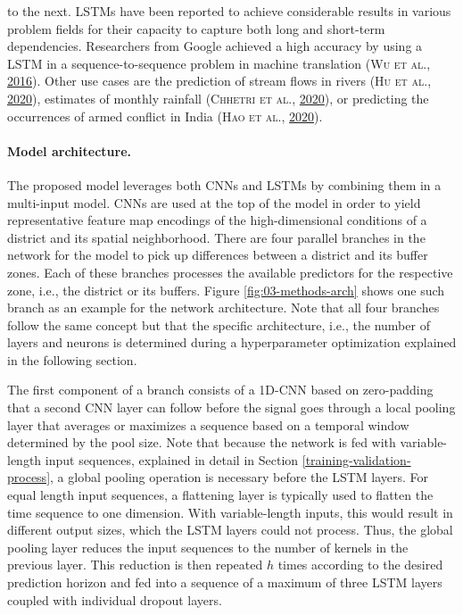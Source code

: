 \documentclass[a4paper,11pt]{article}
\begin{document}
to the next.
LSTMs have
been reported to achieve considerable results in various problem fields for their
capacity to capture both long and short-term dependencies. Researchers
from Google achieved a high accuracy by using a LSTM in a sequence-to-sequence problem
in machine translation \textsc{(\textnormal{\textsc{Wu} \textsc{et al.}}, \textnormal{\protect\hyperlink{ref-wu2016}{2016}})}. Other use cases are the prediction of stream flows
in rivers \textsc{(\textnormal{\textsc{Hu} \textsc{et al.}}, \textnormal{\protect\hyperlink{ref-hu2020}{2020}})}, estimates of monthly rainfall \textsc{(\textnormal{\textsc{Chhetri} \textsc{et al.}}, \textnormal{\protect\hyperlink{ref-chhetri2020}{2020}})}, or predicting
the occurrences of armed conflict in India \textsc{(\textnormal{\textsc{Hao} \textsc{et al.}}, \textnormal{\protect\hyperlink{ref-hao2020a}{2020}})}.

\newpage

\hypertarget{model-architecture.}{%
\paragraph{Model architecture.}\label{model-architecture.}}

The proposed model leverages both CNNs and LSTMs by combining them
in a multi-input model. CNNs are used at the top of the model in
order to yield representative feature map encodings of the high-dimensional
conditions of a district and its spatial neighborhood. There are four parallel
branches in the network for the model to pick up differences between a district
and its buffer zones. Each of these branches processes the available predictors for the
respective zone, i.e., the district or its buffers. Figure \ref{fig:03-methods-arch}
shows one such branch as an example for the network architecture. Note that all four
branches follow the same concept but that the specific architecture, i.e., the
number of layers and neurons is determined during a hyperparameter optimization
explained in the following section.

The first component of a branch consists of a 1D-CNN based on zero-padding
that a second CNN layer can follow before the signal goes through a local pooling layer that
averages or maximizes a sequence based on a temporal window determined by
the pool size. Note that because the network is fed with variable-length input
sequences, explained in detail in Section \ref{training-validation-process},
a global pooling operation is necessary before the LSTM layers. For equal
length input sequences, a flattening layer is typically used to flatten
the time sequence to one dimension. With variable-length inputs, this would result
in different output sizes, which the LSTM layers could not process. Thus,
the global pooling layer reduces the input sequences to the number of kernels in
the previous layer. This reduction is then repeated \(h\) times according to the desired
prediction horizon and fed into a sequence of a maximum of three LSTM layers
coupled with individual dropout layers.
\end{document}
